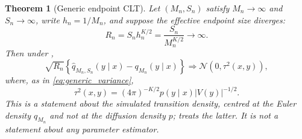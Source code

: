 \documentclass[11pt]{article}
\newtheorem{theorem}{Theorem}[section]
\theoremstyle{definition}
\newcommand{\Normal}{\mathcal{N}}
\begin{document}
\begin{theorem}[Generic endpoint CLT]\label{thm:generic_clt}
Let $(M_n,S_n)$ satisfy $M_n\to\infty$ and $S_n\to\infty$, write $h_n=1/M_n$, and suppose the effective endpoint size diverges:
\begin{equation}\label{eq:effective_diverge_general}
R_n=S_nh_n^{K/2}=\frac{S_n}{M_n^{K/2}}\longrightarrow\infty .
\end{equation}
Then under ,
\begin{equation}\label{eq:generic_clt}
\sqrt{R_n}
\left\{\widehat q_{M_n,S_n}(y\mid x)-q_{M_n}(y\mid x)\right\}
\Longrightarrow
\Normal\!\left(0,\tau^2(x,y)\right),
\end{equation}
where, as in \eqref{eq:generic_variance},
\begin{equation}\label{eq:tau_restated}
\tau^2(x,y)=(4\pi)^{-K/2}p(y\mid x)|V(y)|^{-1/2}.
\end{equation}
This is a statement about the simulated transition density, centred at the Euler density $q_{M_n}$ and not at the diffusion density $p$;  treats the latter. It is not a statement about any parameter estimator.
\end{theorem}
\end{document}
